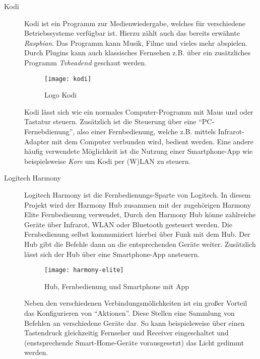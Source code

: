 \begin{description}
    \item[Kodi \cite{AboutKod6:online}]
        Kodi ist ein Programm zur Medienwiedergabe, welches für verschiedene Betriebssysteme verfügbar ist.
        Hierzu zählt auch das bereits erwähnte \textit{Raspbian}.
        Das Programm kann Musik, Filme und vieles mehr abspielen.
        Durch Plugins kann auch klassisches Fernsehen z.B.
        über ein zusätzliches Programm \textit{Tvheadend \cite{tvheadend:online}} geschaut werden.

        \begin{figure}[h!]
            \centering
            \texttt{[image: kodi]}
            \caption{Logo Kodi}\label{fig:kodi}
        \end{figure}

        Kodi lässt sich wie ein normales Computer-Programm mit Maus und oder Tastatur steuern.
        Zusätzlich ist die Steuerung über eine \enquote{PC-Fernebdienung},
        also einer Fernbedienung, welche z.B. mittels Infrarot-Adapter mit dem Computer verbunden wird,
        bedient werden.
        Eine andere häufig verwendete Möglichkeit ist die Nutzung einer Smartphone-App wie beispielsweise \textit{Kore} um Kodi per (W)LAN zu steuern.

    \item[Logitech Harmony \cite{HarmonyH15:online}]
        Logitech Harmony ist die Fernbedienungs-Sparte von Logitech.
        In diesem Projekt wird der Harmony Hub zusammen mit der zugehörigen Harmony Elite Fernbedienung verwendet,
        Durch den Harmony Hub könne zahlreiche Geräte über Infrarot, WLAN oder Bluetooth gesteuert werden.
        Die Fernbedienung selbst kommuniziert hierbei über Funk \cite{HowToPoi90:online} mit dem Hub.
        Der Hub gibt die Befehle dann an die entsprechenden Geräte weiter.
        Zusätzlich lässt sich der Hub über eine Smartphone-App ansteuern.

        \begin{figure}[h!]
            \centering
            \texttt{[image: harmony-elite]}
            \caption{Hub, Fernbedienung und Smartphone mit App}\label{fig:harmony}
        \end{figure}

        Neben den verschiedenen Verbindungsmölichkeiten ist ein großer Vorteil das Konfigurieren von \enquote{Aktionen}.
        Diese Stellen eine Sammlung von Befehlen an verschiedene Geräte dar.
        So kann beispielsweise über einen Tastendruck gleichzeitig Fernseher und Receiver eingeschaltet
        und (enstsprechende Smart-Home-Geräte vorausgesetzt) das Licht gedimmt werden.
\end{description}
